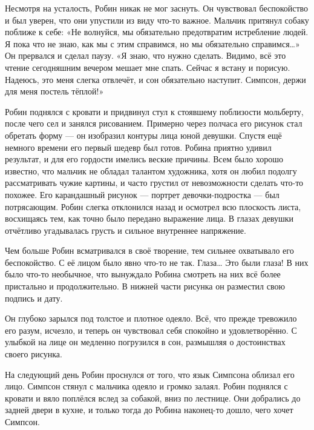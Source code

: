 \documentclass[a4paper,12pt]{book}
\begin{document}
	Несмотря на усталость, Робин никак не мог заснуть. Он чувствовал беспокойство и был уверен, что они упустили из виду что-то важное. Мальчик притянул собаку поближе к себе:
	«Не волнуйся, мы обязательно предотвратим истребление людей. Я пока что не знаю, как мы с этим справимся, но мы обязательно справимся…»
	Он прервался и сделал паузу.
	«Я знаю, что нужно сделать. Видимо, всё это чтение сегодняшним вечером мешает мне спать. Сейчас я встану и порисую. Надеюсь, это меня слегка отвлечёт, и сон обязательно наступит. Симпсон, держи для меня постель тёплой!»

	Робин поднялся с кровати и придвинул стул к стоявшему поблизости мольберту, после чего сел и занялся рисованием.
	Примерно через полчаса его рисунок стал обретать форму — он изобразил контуры лица юной девушки. Спустя ещё немного времени его первый шедевр был готов.
	Робина приятно удивил результат, и для его гордости имелись веские причины. Всем было хорошо известно, что мальчик не обладал талантом художника, хотя он любил подолгу рассматривать чужие картины, и часто грустил от невозможности сделать что-то похожее. Его карандашный рисунок — портрет девочки-подростка — был потрясающим.
	Робин слегка отклонился назад и осмотрел всю плоскость листа, восхищаясь тем, как точно было передано выражение лица. В глазах девушки отчётливо угадывалась грусть и сильное внутреннее напряжение.
	
Чем больше Робин всматривался в своё творение, тем сильнее охватывало его беспокойство. С её лицом было явно что-то не так. Глаза… Это были глаза! В них было что-то необычное, что вынуждало Робина смотреть на них всё более пристально и продолжительно. В нижней части рисунка он разместил свою подпись и дату.

	Он глубоко зарылся под толстое и плотное одеяло. Всё, что прежде тревожило его разум, исчезло, и теперь он чувствовал себя спокойно и удовлетворённо. С улыбкой на лице он медленно погрузился в сон, размышляя о достоинствах своего рисунка.

	На следующий день Робин проснулся от того, что язык Симпсона облизал его лицо. Симпсон стянул с мальчика одеяло и громко залаял. Робин поднялся с кровати и вяло поплёлся вслед за собакой, вниз по лестнице. Они добрались до задней двери в кухне, и только тогда до Робина наконец-то дошло, чего хочет Симпсон.
\end{document}
